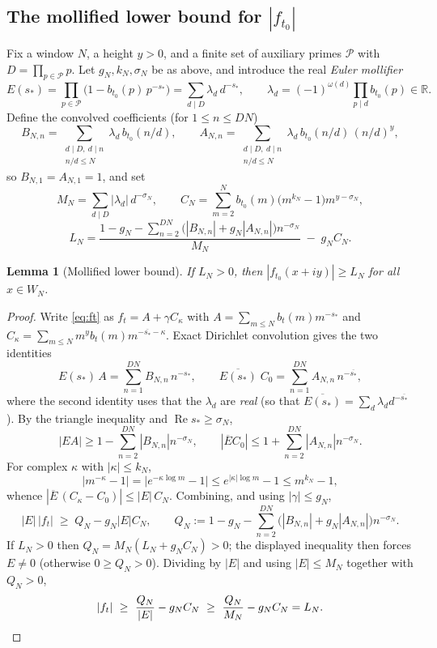 \documentclass[11pt]{article}
\newtheorem{lemma}[theorem]{Lemma}
\theoremstyle{definition}
\newcommand{\R}{\mathbb{R}}
\newcommand{\calP}{\mathcal{P}}
\DeclareMathOperator{\Rea}{Re}
\begin{document}
\subsection{The mollified lower bound for $|f_{t_0}|$}\label{sec:native}

Fix a window $N$, a height $y>0$, and a finite set of auxiliary primes
$\calP$ with $D=\prod_{p\in\calP}p$. Let $g_N,k_N,\sigma_N$ be as
above, and introduce the real \emph{Euler mollifier}
\[
E(s_*)=\prod_{p\in\calP}\bigl(1-b_{t_0}(p)\,p^{-s_*}\bigr)
=\sum_{d\mid D}\lambda_d\,d^{-s_*},
\qquad
\lambda_d=(-1)^{\omega(d)}\prod_{p\mid d}b_{t_0}(p)\in\R .
\]
Define the convolved coefficients (for $1\le n\le DN$)
\[
B_{N,n}=\sum_{\substack{d\mid D,\ d\mid n\\ n/d\le N}}
\lambda_d\,b_{t_0}(n/d),
\qquad
A_{N,n}=\sum_{\substack{d\mid D,\ d\mid n\\ n/d\le N}}
\lambda_d\,b_{t_0}(n/d)\,(n/d)^y,
\]
so $B_{N,1}=A_{N,1}=1$, and set
\[
M_N=\sum_{d\mid D}|\lambda_d|\,d^{-\sigma_N},
\qquad
C_N=\sum_{m=2}^{N}b_{t_0}(m)\bigl(m^{k_N}-1\bigr)m^{y-\sigma_N},
\]
\begin{equation}\label{eq:LN}
L_N=\frac{1-g_N-\sum_{n=2}^{DN}
\bigl(|B_{N,n}|+g_N|A_{N,n}|\bigr)n^{-\sigma_N}}{M_N}
\;-\;g_NC_N .
\end{equation}

\begin{lemma}[Mollified lower bound]\label{lem:native}
If $L_N>0$, then $|f_{t_0}(x+iy)|\ge L_N$ for all $x\in W_N$.
\end{lemma}

\begin{proof}
Write \eqref{eq:ft} as $f_t=A+\gamma C_\kappa$ with
$A=\sum_{m\le N}b_t(m)m^{-s_*}$ and
$C_\kappa=\sum_{m\le N}m^yb_t(m)m^{-\overline{s_*}-\kappa}$. Exact
Dirichlet convolution gives the two identities
\begin{equation}\label{eq:conv}
E(s_*)\,A=\sum_{n=1}^{DN}B_{N,n}\,n^{-s_*},
\qquad
\overline{E(s_*)}\;C_0=\sum_{n=1}^{DN}A_{N,n}\,n^{-\overline{s_*}} ,
\end{equation}
where the second identity uses that the $\lambda_d$ are \emph{real}
(so that $\overline{E(s_*)}=\sum_d\lambda_d d^{-\overline{s_*}}$).
By the triangle inequality and $\Rea s_*\ge\sigma_N$,
\[
|EA|\ge1-\sum_{n=2}^{DN}|B_{N,n}|n^{-\sigma_N},
\qquad
|\overline EC_0|\le1+\sum_{n=2}^{DN}|A_{N,n}|n^{-\sigma_N}.
\]
For complex $\kappa$ with $|\kappa|\le k_N$,
\begin{equation}\label{eq:kappaest}
|m^{-\kappa}-1|=\bigl|e^{-\kappa\log m}-1\bigr|
\le e^{|\kappa|\log m}-1\le m^{k_N}-1,
\end{equation}
whence $|\overline E\,(C_\kappa-C_0)|\le|E|\,C_N$. Combining, and
using $|\gamma|\le g_N$,
\[
|E|\,|f_t|\;\ge\;Q_N-g_N|E|C_N,
\qquad
Q_N:=1-g_N-\sum_{n=2}^{DN}\bigl(|B_{N,n}|+g_N|A_{N,n}|\bigr)n^{-\sigma_N}.
\]
If $L_N>0$ then $Q_N=M_N(L_N+g_NC_N)>0$; the displayed inequality then
forces $E\ne0$ (otherwise $0\ge Q_N>0$). Dividing by $|E|$ and using
$|E|\le M_N$ together with $Q_N>0$,
\[
|f_t|\ \ge\ \frac{Q_N}{|E|}-g_NC_N
\ \ge\ \frac{Q_N}{M_N}-g_NC_N=L_N. \qedhere
\]
\end{proof}
\end{document}
